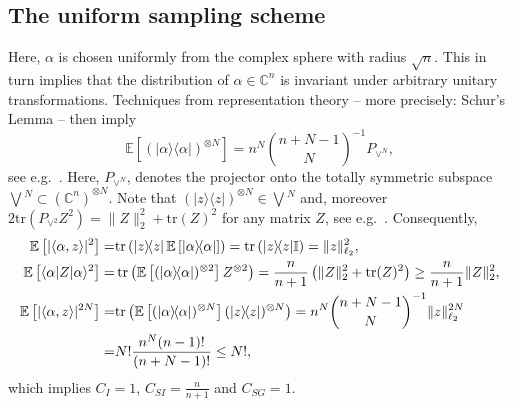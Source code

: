 \subsection{The uniform sampling scheme}

Here, $\alpha$ is chosen uniformly from the complex sphere with radius $\sqrt{n}$.
This in turn implies that the distribution of $\alpha \in \mathbb{C}^n$ is invariant under arbitrary unitary transformations.
Techniques from representation theory -- more precisely: Schur's Lemma -- then imply
\begin{equation}
  \label{eq:from_schur}
  \mathbb{E} \left[ (|\alpha \rangle \! \langle \alpha| )^{\otimes N} \right] =
  n^N \binom{n+N-1}{N}^{-1}  P_{\vee^N},
\end{equation}
see e.g.\ \cite[Lemma~1]{scott_tight_2006}.
Here, $ P_{\vee^N}$, denotes the projector onto the totally symmetric subspace $\bigvee\!^N \subset \left( \mathbb{C}^n \right)^{\otimes N}$.
Note that $\left(| z \rangle \! \langle  z| \right)^{\otimes N} \in \bigvee\!^N$ and, moreover $2 \mathrm{tr} \left(  P_{\vee^2}  Z^2 \right)= \|  Z \|_2^2 + \mathrm{tr} ( Z)^2$ for any matrix $ Z$, see e.g.\ \cite[Lemma~17]{kueng_low_2016}.
Consequently,
\begin{align*}
  \mathbb{E} \left[ | \langle\alpha, z \rangle|^2 \right]
  =& \mathrm{tr} \left( | z \rangle \! \langle  z| \, \mathbb{E} \left[ |\alpha \rangle \! \langle\alpha| \right] \right)
  = \mathrm{tr} \left( | z \rangle \! \langle  z| \mathbb{I} \right) = \|  z \|_{\ell_2}^2, \\
  \mathbb{E} \left[
  \langle\alpha| Z |\alpha \rangle^2 \right]
  =& \operatorname{tr} \left( \mathbb{E} \left[ (|\alpha \rangle \! \langle\alpha|)^{\otimes 2} \right]  Z^{\otimes 2} \right)
  = \frac{n}{n+1} \left( \|  Z \|_2^2 + \mathrm{tr}( Z)^2 \right) \geq \frac{n}{n+1} \|  Z \|_2^2, \\
  \mathbb{E} \left[ | \langle\alpha,  z \rangle |^{2N} \right]
  =& \mathrm{tr} \left(\mathbb{E} \left[ (|\alpha \rangle \! \langle\alpha|)^{\otimes N} \right]  (| z\rangle \! \langle  z|)^{\otimes N}  \right)
  = n^N \binom{n+N-1}{N}^{-1} \|  z \|_{\ell_2}^{2N} \\
  =& N! \frac{n^N (n-1)!}{(n+N-1)!} \leq N!,
\end{align*}
which implies $C_I=1$, $C_{SI} = \frac{n}{n+1}$ and $C_{SG}=1$.



